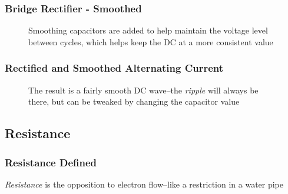 \begin{frame}
    \frametitle{Bridge Rectifier - Smoothed}

    \begin{figure}
        \centering
        \resizebox{0.75\linewidth}{!}{
            
        }

        {\footnotesize Smoothing capacitors are added to help maintain the voltage level between cycles, which helps keep the DC at a more consistent value\par}

    \end{figure}

\end{frame}

\begin{frame}
    \frametitle{Rectified and Smoothed Alternating Current}

    \begin{figure}
        \centering
        \resizebox{0.75\linewidth}{!}{
            
        }

        {\footnotesize The result is a fairly smooth DC wave--the \emph{ripple} will always be there, but can be tweaked by changing the capacitor value\par}
    \end{figure}

\end{frame}

\subsection{Resistance}

\begin{frame}
    \frametitle{Resistance Defined}

    \begin{figure}
        \centering
        \resizebox{0.75\linewidth}{!}{
            
        }
    \end{figure}

    \vspace{0.5em}
    \centering
    {\footnotesize \emph{Resistance} is the opposition to electron flow--like a restriction in a water pipe\par}

\end{frame}

